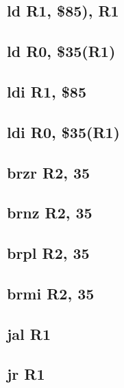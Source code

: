 \documentclass{article}
\begin{document}
    \subsection{ld R1, \$85), R1} \label{ld_case_1_sequence}
        
    \subsection{ld R0, \$35(R1)} \label{ld_case_2_sequence}
        
    \subsection{ldi R1, \$85} \label{ldi_case_1_sequence}
        
    \subsection{ldi R0, \$35(R1)} \label{ldi_case_2_sequence}
        
    \subsection{brzr R2, 35} \label{brzr_sequence}
        
    \subsection{brnz R2, 35} \label{brnz_sequence}
        
    \subsection{brpl R2, 35} \label{brpl_sequence}
        
    \subsection{brmi R2, 35} \label{brmi_sequence}
        
    \subsection{jal R1} \label{jal_sequence}
        
    \subsection{jr R1} \label{jr_sequence}
        
\end{document}
